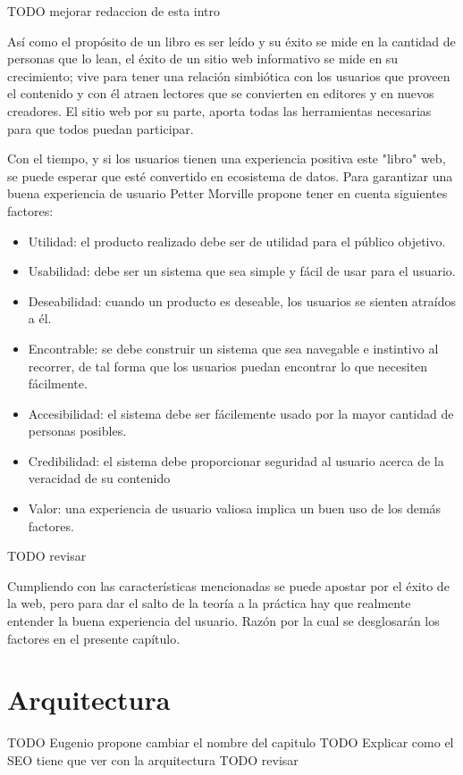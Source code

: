 
TODO mejorar redaccion de esta intro

Así como el propósito de un libro es ser leído y su éxito se mide en la cantidad de personas que lo lean, el éxito de un sitio web informativo se mide en su crecimiento; vive para tener una relación simbiótica con los usuarios que proveen el contenido y con él atraen lectores que se convierten en editores y en nuevos creadores. El sitio web por su parte, aporta todas las herramientas necesarias para que todos puedan participar.

Con el tiempo, y si los usuarios tienen una experiencia positiva este "libro" web, se puede esperar que esté convertido en ecosistema de datos. Para garantizar una buena experiencia de usuario Petter Morville \cite{UXFactors} propone tener en cuenta siguientes factores:

\begin{itemize}
  \item Utilidad: el producto realizado debe ser de utilidad para el público objetivo.
  \item Usabilidad: debe ser un sistema que sea simple y fácil de usar para el usuario.
  \item Deseabilidad: cuando un producto es deseable, los usuarios se sienten atraídos a él.
  \item Encontrable: se debe construir un sistema que sea navegable e instintivo al recorrer, de tal forma que los usuarios puedan encontrar lo que necesiten fácilmente.
  \item Accesibilidad: el sistema debe ser fácilemente usado por la mayor cantidad de personas posibles.
  \item Credibilidad: el sistema debe proporcionar seguridad al usuario acerca de la veracidad de su contenido
  \item Valor: una experiencia de usuario valiosa implica un buen uso de los demás factores.
\end{itemize}

TODO revisar

Cumpliendo con las características mencionadas se puede apostar por el éxito de la web, pero para dar el salto de la teoría a la práctica hay que realmente entender la buena experiencia del usuario. Razón por la cual se desglosarán los factores en el presente capítulo.

\section{Arquitectura}
TODO Eugenio propone cambiar el nombre del capitulo
TODO Explicar como el SEO tiene que ver con la arquitectura
TODO revisar

